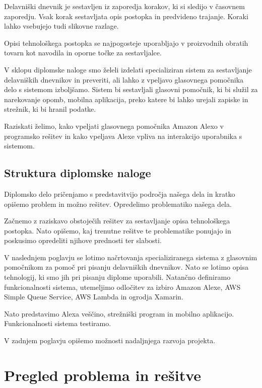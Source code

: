 \documentclass[a4paper, 12pt]{book}
\begin{document}
Delavniški dnevnik je sestavljen iz zaporedja korakov, ki si sledijo v časovnem zaporedju.
Vsak korak sestavljata opis postopka in predvideno trajanje.
Koraki lahko vsebujejo tudi slikovne razlage.

Opisi tehnološkega postopka se najpogosteje uporabljajo v proizvodnih obratih tovarn kot navodila in oporne točke za sestavljalce.

V sklopu diplomske naloge smo želeli izdelati specializiran sistem za sestavljanje delavniških dnevnikov in preveriti, ali lahko z vpeljavo glasovnega pomočnika delo s sistemom izboljšamo.
Sistem bi sestavljali glasovni pomočnik, ki bi služil za narekovanje opomb, mobilna aplikacija, preko katere bi lahko urejali zapiske in strežnik, ki bi hranil podatke.

Raziskati želimo, kako vpeljati glasovnega pomočnika Amazon Alexo v programsko rešitev in kako vpeljava Alexe vpliva na interakcijo uporabnika s sistemom.


\section{Struktura diplomske naloge}

Diplomsko delo pričenjamo s predstavitvijo področja našega dela in kratko opišemo problem in možno rešitev. 
Opredelimo problematiko našega dela.

Začnemo z raziskavo obstoječih rešitev za sestavljanje opisa tehnološkega postopka.
Nato opišemo, kaj trenutne rešitve te problematike ponujajo in poskusimo opredeliti njihove prednosti ter slabosti.

V naslednjem poglavju se lotimo načrtovanja specializiranega sistema z glasovnim pomočnikom za pomoč pri pisanju delavniških dnevnikov.
Nato se lotimo opisa tehnologij, ki smo jih pri pisanju diplome uporabili.
Natančno definiramo funkcionalnosti sistema, utemeljimo odločitev za izbiro Amazon Alexe, AWS Simple Queue Service, AWS Lambda in ogrodja Xamarin.

Nato predstavimo Alexa veščino, strežniški program in mobilno aplikacijo.
Funkcionalnosti sistema testiramo.

V zadnjem poglavju opišemo možnosti nadaljnjega razvoja projekta.

\chapter{Pregled problema in rešitve}
\end{document}
